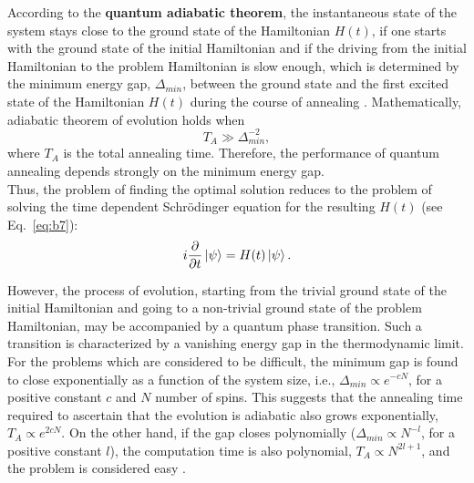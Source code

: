 \documentclass[../main.tex]{subfiles}
\begin{document}
According to the \textbf{quantum adiabatic theorem}, the instantaneous state of the system stays close to the ground state of the Hamiltonian $H(t)$, if one starts with the ground state of the initial Hamiltonian and if the driving from the initial Hamiltonian to the problem Hamiltonian is slow enough, which is determined by the minimum energy gap, $\Delta_{min}$, between the ground state and the first excited state of the Hamiltonian $H(t)$ during the course of annealing \cite{born1928beweis,farhi2000quantum}. Mathematically, adiabatic theorem of evolution holds when 
\begin{equation}
T_A \gg {\Delta}_{min}^{-2}, \label{eq:b8}
\end{equation}
where $T_A$ is the total annealing time. Therefore, the performance of quantum annealing depends strongly on the minimum energy gap.\\
Thus, the problem of finding the optimal solution reduces to the problem of solving the time dependent Schr{\"o}dinger equation for the resulting $H(t)$ (see Eq.~\ref{eq:b7}):
\begin{equation}
i\frac{\partial}{\partial t}\ket{\psi}=H(t)\ket{\psi}.    \label{eq:b9}
\end{equation}

However, the process of evolution, starting from the trivial ground state of the initial Hamiltonian and going to a non-trivial ground state of the problem Hamiltonian, may be accompanied by a quantum phase transition. Such a transition is characterized by a vanishing energy gap in the thermodynamic limit. For the problems which are considered to be difficult, the minimum gap is found to close exponentially as a function of the system size, i.e., $\Delta_{min} \propto e^{-cN}$, for a positive constant $c$ and $N$ number of spins. This suggests that the annealing time required to ascertain that the evolution is adiabatic also grows exponentially, $T_A \propto e^{2cN}$. On the other hand, if the gap closes polynomially ($\Delta_{min} \propto N^{-l}$, for a positive constant $l$), the computation time is also polynomial, $T_A \propto N^{2l+1}$, and the problem is considered easy \cite{hauke2019perspectives}.
\end{document}
